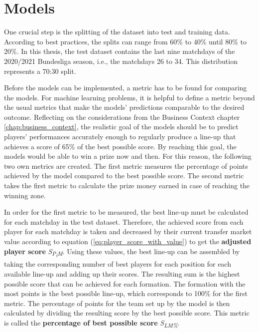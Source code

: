 \clearpage \section{Models}

\label{chap:models}

One crucial step is the splitting of the dataset into test and training data. According to best practices, the splits can range from 60\% to 40\% until 80\% to 20\%. In this thesis, the test dataset contains the last nine matchdays of the 2020/2021 Bundesliga season, i.e., the matchdays 26 to 34. This distribution represents a 70:30 split.

Before the models can be implemented, a metric has to be found for comparing the models. For machine learning problems, it is helpful to define a metric beyond the usual metrics that make the models' predictions comparable to the desired outcome. Reflecting on the considerations from the Business Context chapter \ref{chap:business_context}, the realistic goal of the models should be to predict players' performances accurately enough to regularly produce a line-up that achieves a score of 65\% of the best possible score. By reaching this goal, the models would be able to win a prize now and then. For this reason, the following two own metrics are created. The first metric measures the percentage of points achieved by the model compared to the best possible score. The second metric takes the first metric to calculate the prize money earned in case of reaching the winning zone.

In order for the first metric to be measured, the best line-up must be calculated for each matchday in the test dataset. Therefore, the achieved score from each player for each matchday is taken and decreased by their current transfer market value according to equation (\ref{eq:player_score_with_value}) to get the \textbf{adjusted player score} \emph{S\textsubscript{P\textsubscript{i}M}}. Using these values, the best line-up can be assembled by taking the corresponding number of best players for each position for each available line-up and adding up their scores. The resulting sum is the highest possible score that can be achieved for each formation. The formation with the most points is the best possible line-up, which corresponds to 100\% for the first metric. The percentage of points for the team set up by the model is then calculated by dividing the resulting score by the best possible score. This metric is called the \textbf{percentage of best possible score} \emph{S\textsubscript{LM\%}}.

